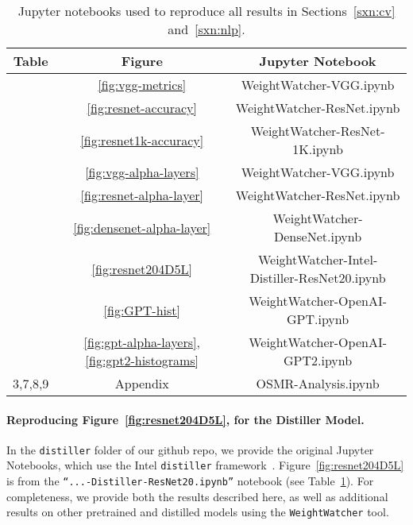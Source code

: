 \begin{table}[t]
\small
\begin{center}
\begin{tabular}{|c|c|c|}
\hline
Table & Figure & Jupyter Notebook \\
\hline
& \ref{fig:vgg-metrics}                                 & WeightWatcher-VGG.ipynb \\
& \ref{fig:resnet-accuracy}                             & WeightWatcher-ResNet.ipynb \\
& \ref{fig:resnet1k-accuracy}                           & WeightWatcher-ResNet-1K.ipynb \\
& \ref{fig:vgg-alpha-layers}                            & WeightWatcher-VGG.ipynb \\
& \ref{fig:resnet-alpha-layer}                          & WeightWatcher-ResNet.ipynb \\
& \ref{fig:densenet-alpha-layer}                        & WeightWatcher-DenseNet.ipynb \\
\hline
& \ref{fig:resnet204D5L}                                & WeightWatcher-Intel-Distiller-ResNet20.ipynb \\
\hline
& \ref{fig:GPT-hist}                                    & WeightWatcher-OpenAI-GPT.ipynb \\
& \ref{fig:gpt-alpha-layers}, \ref{fig:gpt2-histograms} & WeightWatcher-OpenAI-GPT2.ipynb \\
\hline
3,7,8,9 & Appendix & OSMR-Analysis.ipynb \\
\hline
\end{tabular}
\end{center}
\caption{Jupyter notebooks used to reproduce all results in Sections~\ref{sxn:cv} and~\ref{sxn:nlp}.}
\label{table:notebooks}
\end{table}


\paragraph{Reproducing Figure~\ref{fig:resnet204D5L}, for the Distiller Model.}

In the \texttt{distiller} folder of our github repo, 
we provide the original Jupyter Notebooks, which use the Intel \texttt{distiller} framework~\cite{distiller}.   %
Figure~\ref{fig:resnet204D5L} is from the  \texttt{``...-Distiller-ResNet20.ipynb''} notebook (see Table~\ref{table:notebooks}).  
For completeness, we provide both the results described here, as well as additional results on other pretrained and distilled models using the \texttt{WeightWatcher} tool.


